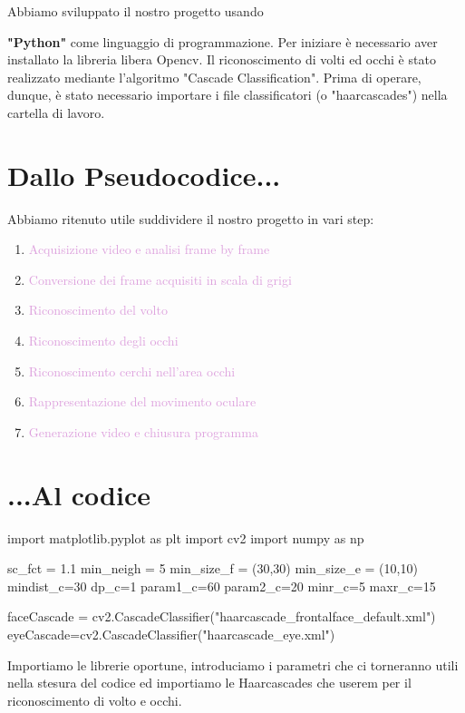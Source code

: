 \documentclass[12pt]{article}
\begin{document}
Abbiamo sviluppato il nostro progetto usando {\textbf{"Python"} come linguaggio di programmazione. Per iniziare è necessario aver installato la libreria libera Opencv. Il riconoscimento di volti ed occhi è stato realizzato mediante l'algoritmo "Cascade Classification". Prima di operare, dunque, è stato necessario importare i file classificatori (o "haarcascades") nella cartella di lavoro.
\pagebreak

\section{Dallo Pseudocodice...}
Abbiamo ritenuto utile suddividere il nostro progetto in vari step:
\begin{enumerate}
	\item \label{primo}\textcolor{Plum}{Acquisizione video e analisi frame by frame}
	\item \label{secondo} \textcolor{Plum}{Conversione dei frame acquisiti in scala di grigi}
	\item \label{terzo} \textcolor{Plum}{Riconoscimento del volto}
	\item \label{quarto}\textcolor{Plum}{Riconoscimento degli occhi}
    \item \label{quinto}\textcolor{Plum}{Riconoscimento cerchi nell'area occhi}
    \item \label{sesto}\textcolor{Plum}{Rappresentazione del movimento oculare}
    \item \label{settimo}\textcolor{Plum}{Generazione video e chiusura programma}
\end{enumerate}

\pagebreak
\section{...Al codice}
\begin{codice}
import matplotlib.pyplot as plt
import cv2
import numpy as np

sc_fct = 1.1              
min_neigh = 5             
min_size_f = (30,30)      
min_size_e = (10,10)        
mindist_c=30               
dp_c=1                   
param1_c=60               
param2_c=20              
minr_c=5                
maxr_c=15                 


faceCascade = cv2.CascadeClassifier("haarcascade_frontalface_default.xml")
eyeCascade=cv2.CascadeClassifier("haarcascade_eye.xml")
\end{codice}
\vspace{1cm}
Importiamo le librerie oportune, introduciamo i parametri che ci torneranno utili nella stesura del codice ed importiamo le Haarcascades che userem per il riconoscimento di volto e occhi.
\vspace{1.5cm}



}
\end{document}
